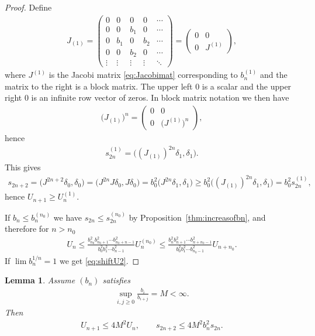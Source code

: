 \documentclass[11pt]{article}
\numberwithin{equation}{section}
\newtheorem{lem}[thm]{Lemma}
\begin{document}
\begin{proof} Define
\begin{gather*}
J_{(1)}=\begin{pmatrix} 0 & 0 & 0 & 0 & \cdots\\
 0 & 0 & b_1 & 0 & \cdots\\
 0 & b_1 & 0 & b_2 & \cdots\\
 0 & 0 & b_2 & 0 & \cdots\\
 \vdots & \vdots & \vdots & \vdots & \ddots
\end{pmatrix}=
\begin{pmatrix} 0 & 0\\
0 & J^{(1)}
\end{pmatrix},
\end{gather*}
where $J^{(1)}$ is the Jacobi matrix \eqref{eq:Jacobimat} corresponding to $b_n^{(1)}$ and the matrix to the right is a block matrix. The upper left $0$ is a scalar and the upper right $0$ is an infinite row vector of zeros. In block matrix notation we then have
\begin{gather*}
\big(J_{(1)}\big)^n=\begin{pmatrix} 0 & 0\\
0 & \big(J^{(1)}\big)^n
\end{pmatrix},
\end{gather*}
hence
\begin{gather*}
s_{2n}^{(1)}=\big((J_{(1)})^{2n} \delta_1,\delta_1\big).
\end{gather*}
This gives
\begin{gather*}
s_{2n+2} = \big(J^{2n+2}\delta_0,\delta_0\big)=\big(J^{2n}J\delta_0,J\delta_0\big)=b_0^2\big(J^{2n}\delta_1,\delta_1\big)
\ge b_0^2 \big((J_{(1)})^{2n} \delta_1,\delta_1\big)=b_0^2s_{2n}^{(1)},
\end{gather*}
hence $U_{n+1}\ge U_n^{(1)}$.

If $b_n\le b_n^{(n_0)}$ we have $s_{2n}\le s_{2n}^{(n_0)}$ by Proposition~\ref{thm:increasofbn}, and therefore for $n>n_0$
\begin{gather*}
U_n\le \frac{b_{n_0}^2b_{n_0+1}^2\cdots b_{n_0+n-1}^2}{b_0^2 b_1^2\cdots b_{n-1}^2}U_n^{(n_0)}\le \frac{b_n^2b_{n+1}^2\cdots b_{n+n_0-1}^2}{b_0^2 b_1^2\cdots b_{n_0-1}^2}U_{n+n_0}.
\end{gather*}
If $\lim b_n^{1/n}=1$ we get \eqref{eq:shiftU2}.
\end{proof}

\begin{lem}\label{thm:b_i/b_{i+1}} Assume $(b_n)$ satisfies
\begin{gather*}
\sup_{i,j\ge 0}\frac{b_i}{b_{i+j}}=M<\infty.
\end{gather*}
Then
\begin{gather}\label{eq:Un+1}
U_{n+1}\le 4M^2U_n,\qquad s_{2n+2}\le 4M^2b_n^2s_{2n}.
\end{gather}
\end{lem}
\end{document}
